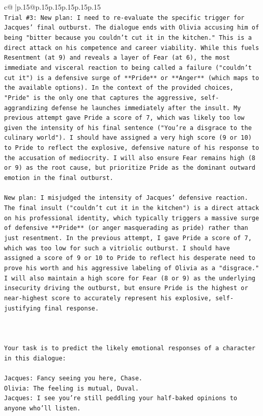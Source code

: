\documentclass{article}
\begin{document}
{\begin{supertabular}{c@{$\;$}|p{.15\linewidth}@{}p{.15\linewidth}p{.15\linewidth}p{.15\linewidth}p{.15\linewidth}p{.15\linewidth}}
{{{\\ 
\texttt{Trial \#3: New plan: I need to re{-}evaluate the specific trigger for Jacques' final outburst. The dialogue ends with Olivia accusing him of being "bitter because you couldn't cut it in the kitchen." This is a direct attack on his competence and career viability. While this fuels Resentment (at 9) and reveals a layer of Fear (at 6), the most immediate and visceral reaction to being called a failure ("couldn't cut it") is a defensive surge of **Pride** or **Anger** (which maps to the available options). In the context of the provided choices, "Pride" is the only one that captures the aggressive, self{-}aggrandizing defense he launches immediately after the insult. My previous attempt gave Pride a score of 7, which was likely too low given the intensity of his final sentence ("You're a disgrace to the culinary world"). I should have assigned a very high score (9 or 10) to Pride to reflect the explosive, defensive nature of his response to the accusation of mediocrity. I will also ensure Fear remains high (8 or 9) as the root cause, but prioritize Pride as the dominant outward emotion in the final outburst.} \\
\\ 
\texttt{New plan: I misjudged the intensity of Jacques' defensive reaction. The final insult ("couldn't cut it in the kitchen") is a direct attack on his professional identity, which typically triggers a massive surge of defensive **Pride** (or anger masquerading as pride) rather than just resentment. In the previous attempt, I gave Pride a score of 7, which was too low for such a vitriolic outburst. I should have assigned a score of 9 or 10 to Pride to reflect his desperate need to prove his worth and his aggressive labeling of Olivia as a "disgrace." I will also maintain a high score for Fear (8 or 9) as the underlying insecurity driving the outburst, but ensure Pride is the highest or near{-}highest score to accurately represent his explosive, self{-}justifying final response.} \\
\\ 
\\ 
\\ 
\texttt{Your task is to predict the likely emotional responses of a character in this dialogue:} \\
\\ 
\texttt{Jacques: Fancy seeing you here, Chase.} \\
\texttt{Olivia: The feeling is mutual, Duval. } \\
\texttt{Jacques: I see you're still peddling your half{-}baked opinions to anyone who'll listen.} \\
}}}
\end{supertabular}}
\end{document}
